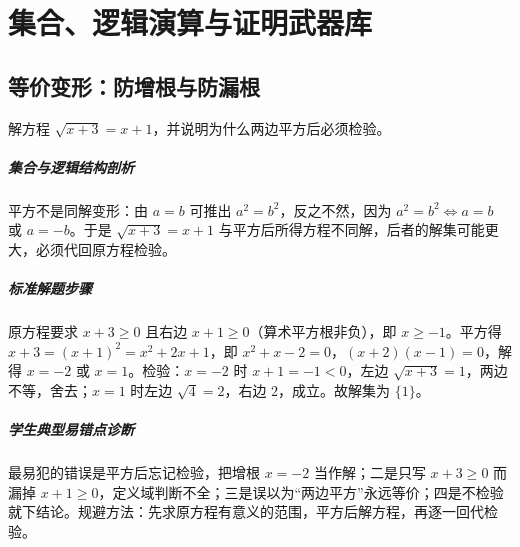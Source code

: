 \chapter{集合、逻辑演算与证明武器库}

\section{等价变形：防增根与防漏根}

\begin{problem}
解方程 $\sqrt{x+3}=x+1$，并说明为什么两边平方后必须检验。
\end{problem}
\begin{solution}
\paragraph{集合与逻辑结构剖析}
平方不是同解变形：由 $a=b$ 可推出 $a^2=b^2$，反之不然，因为 $a^2=b^2\Leftrightarrow a=b$ 或 $a=-b$。于是 $\sqrt{x+3}=x+1$ 与平方后所得方程不同解，后者的解集可能更大，必须代回原方程检验。
\paragraph{标准解题步骤}
原方程要求 $x+3\geq0$ 且右边 $x+1\geq0$（算术平方根非负），即 $x\geq-1$。平方得 $x+3=(x+1)^2=x^2+2x+1$，即 $x^2+x-2=0$，$(x+2)(x-1)=0$，解得 $x=-2$ 或 $x=1$。检验：$x=-2$ 时 $x+1=-1<0$，左边 $\sqrt{x+3}=1$，两边不等，舍去；$x=1$ 时左边 $\sqrt4=2$，右边 $2$，成立。故解集为 $\{1\}$。
\paragraph{学生典型易错点诊断}
最易犯的错误是平方后忘记检验，把增根 $x=-2$ 当作解；二是只写 $x+3\geq0$ 而漏掉 $x+1\geq0$，定义域判断不全；三是误以为“两边平方”永远等价；四是不检验就下结论。规避方法：先求原方程有意义的范围，平方后解方程，再逐一回代检验。
\end{solution}

